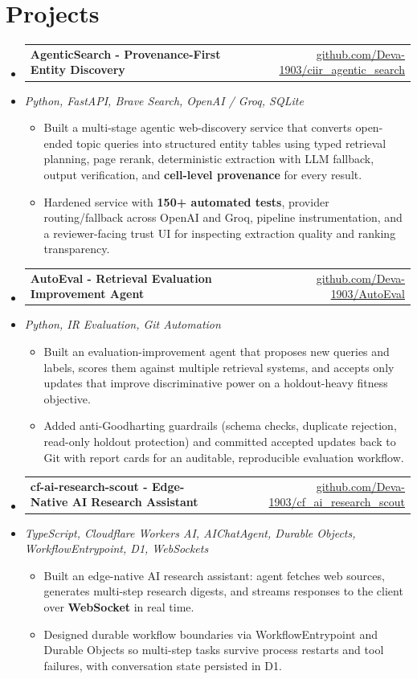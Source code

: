 \documentclass[letterpaper,10pt]{article}
\makeatletter
\newcommand{\resumeItem}[1]{
  \item\small{#1\vspace{-1pt}}
}
\newcommand{\resumeProjectHeading}[2]{
    \item
    \begin{tabular*}{0.985\textwidth}[t]{l@{\extracolsep{\fill}}r}
      \small\textbf{#1} & \small #2 \\
    \end{tabular*}\vspace{-5pt}
}
\newcommand{\resumeProjectSubheading}[1]{
  \vspace{-2pt}\item[] {\small\textcolor{ResumeSlate}{\emph{#1}}}\vspace{-3pt}
}
\newcommand{\resumeSubHeadingListStart}{\begin{itemize}[leftmargin=0.0in, label={}, itemsep=2pt, topsep=2pt]}
\newcommand{\resumeSubHeadingListEnd}{\end{itemize}}
\newcommand{\resumeItemListStart}{\begin{itemize}[leftmargin=0.18in, itemsep=2pt, topsep=1pt]}
\newcommand{\resumeItemListEnd}{\end{itemize}\vspace{-4pt}}
\makeatother
\begin{document}
\section{Projects}
\resumeSubHeadingListStart
  \resumeProjectHeading
    {AgenticSearch - Provenance-First Entity Discovery}
    {\href{https://github.com/Deva-1903/ciir_agentic_search}{github.com/Deva-1903/ciir\_agentic\_search}}
  \resumeProjectSubheading{Python, FastAPI, Brave Search, OpenAI / Groq, SQLite}
    \resumeItemListStart
      \resumeItem{Built a multi-stage agentic web-discovery service that converts open-ended topic queries into structured entity tables using typed retrieval planning, page rerank, deterministic extraction with LLM fallback, output verification, and \textbf{cell-level provenance} for every result.}
      \resumeItem{Hardened service with \textbf{150+ automated tests}, provider routing/fallback across OpenAI and Groq, pipeline instrumentation, and a reviewer-facing trust UI for inspecting extraction quality and ranking transparency.}
    \resumeItemListEnd
  \resumeProjectHeading
    {AutoEval - Retrieval Evaluation Improvement Agent}
    {\href{https://github.com/Deva-1903/AutoEval}{github.com/Deva-1903/AutoEval}}
  \resumeProjectSubheading{Python, IR Evaluation, Git Automation}
    \resumeItemListStart
      \resumeItem{Built an evaluation-improvement agent that proposes new queries and labels, scores them against multiple retrieval systems, and accepts only updates that improve discriminative power on a holdout-heavy fitness objective.}
      \resumeItem{Added anti-Goodharting guardrails (schema checks, duplicate rejection, read-only holdout protection) and committed accepted updates back to Git with report cards for an auditable, reproducible evaluation workflow.}
    \resumeItemListEnd
  \resumeProjectHeading
    {cf-ai-research-scout - Edge-Native AI Research Assistant}
    {\href{https://github.com/Deva-1903/cf_ai_research_scout}{github.com/Deva-1903/cf\_ai\_research\_scout}}
  \resumeProjectSubheading{TypeScript, Cloudflare Workers AI, AIChatAgent, Durable Objects, WorkflowEntrypoint, D1, WebSockets}
    \resumeItemListStart
      \resumeItem{Built an edge-native AI research assistant: agent fetches web sources, generates multi-step research digests, and streams responses to the client over \textbf{WebSocket} in real time.}
      \resumeItem{Designed durable workflow boundaries via WorkflowEntrypoint and Durable Objects so multi-step tasks survive process restarts and tool failures, with conversation state persisted in D1.}
    \resumeItemListEnd
\resumeSubHeadingListEnd
\vspace{-4pt}
\end{document}
